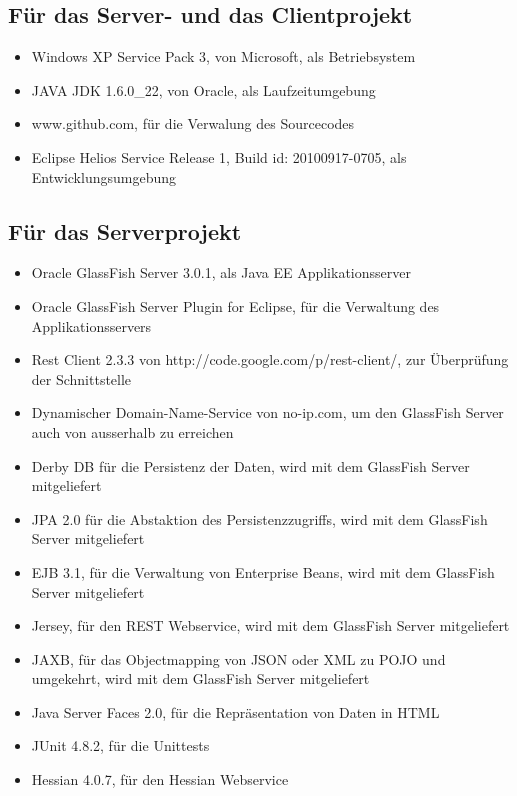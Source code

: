 \documentclass[abstracton, listof=totocnumbered,
bibliography=totocnumbered]{scrreprt}
\begin{document}
  \subsection{Für das Server- und das Clientprojekt}
  
  \begin{itemize}
    \item Windows XP Service Pack 3, von Microsoft, als Betriebsystem
    \item JAVA \ac{JDK} 1.6.0\_22, von Oracle, als Laufzeitumgebung
    \item www.github.com, für die Verwalung des Sourcecodes
    \item Eclipse Helios Service Release 1, Build id: 20100917-0705, als
    Entwicklungsumgebung
  \end{itemize}
  
  \subsection{Für das Serverprojekt}
  
  \begin{itemize}
    \item Oracle GlassFish Server 3.0.1, als Java EE Applikationsserver
    \item Oracle GlassFish Server Plugin for Eclipse, für die Verwaltung
    des Applikationsservers
    \item Rest Client 2.3.3 von http://code.google.com/p/rest-client/, zur
    Überprüfung der Schnittstelle
    \item Dynamischer Domain-Name-Service von no-ip.com, um den GlassFish Server
    auch von ausserhalb zu erreichen
    \item Derby DB für die Persistenz der Daten, wird mit dem GlassFish Server
    mitgeliefert
    \item \ac{JPA} 2.0 für die Abstaktion des Persistenzzugriffs, wird mit dem
    GlassFish Server mitgeliefert
    \item \ac{EJB} 3.1, für die Verwaltung von Enterprise Beans, wird mit dem
    GlassFish Server mitgeliefert
    \item Jersey, für den REST Webservice, wird mit dem GlassFish Server
    mitgeliefert
    \item \ac{JAXB}, für das Objectmapping von \ac{JSON} oder \ac{XML} zu
    \ac{POJO} und umgekehrt, wird mit dem GlassFish Server mitgeliefert
    \item Java Server Faces 2.0, für die Repräsentation von Daten in \ac{HTML}
    \item JUnit 4.8.2, für die Unittests
    \item Hessian 4.0.7, für den Hessian Webservice
  \end{itemize}
  
\end{document}

